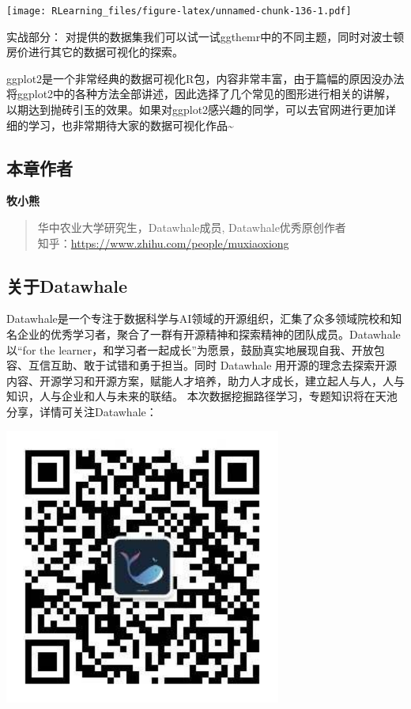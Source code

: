 \documentclass[]{ctexbook}
\begin{document}
\texttt{[image: RLearning\_files/figure-latex/unnamed-chunk-136-1.pdf]}

实战部分：
对提供的数据集我们可以试一试ggthemr中的不同主题，同时对波士顿房价进行其它的数据可视化的探索。

ggplot2是一个非常经典的数据可视化R包，内容非常丰富，由于篇幅的原因没办法将ggplot2中的各种方法全部讲述，因此选择了几个常见的图形进行相关的讲解，以期达到抛砖引玉的效果。如果对ggplot2感兴趣的同学，可以去官网进行更加详细的学习，也非常期待大家的数据可视化作品\textasciitilde{}

\hypertarget{ux672cux7ae0ux4f5cux8005-4}{%
\subsection*{本章作者}\label{ux672cux7ae0ux4f5cux8005-4}}


\textbf{牧小熊}

\begin{quote}
华中农业大学研究生，Datawhale成员, Datawhale优秀原创作者\\
知乎：\url{https://www.zhihu.com/people/muxiaoxiong}
\end{quote}

\hypertarget{ux5173ux4e8edatawhale-4}{%
\subsection*{关于Datawhale}\label{ux5173ux4e8edatawhale-4}}


Datawhale是一个专注于数据科学与AI领域的开源组织，汇集了众多领域院校和知名企业的优秀学习者，聚合了一群有开源精神和探索精神的团队成员。Datawhale 以``for the learner，和学习者一起成长''为愿景，鼓励真实地展现自我、开放包容、互信互助、敢于试错和勇于担当。同时 Datawhale 用开源的理念去探索开源内容、开源学习和开源方案，赋能人才培养，助力人才成长，建立起人与人，人与知识，人与企业和人与未来的联结。 本次数据挖掘路径学习，专题知识将在天池分享，详情可关注Datawhale：

\includegraphics[width=3.58in]{image/logo}
\end{document}
